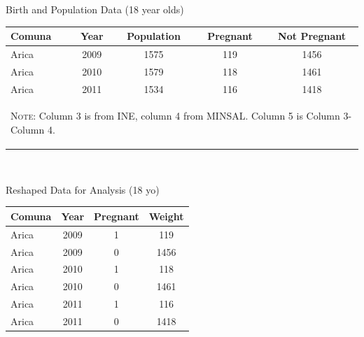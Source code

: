 \documentclass[10pt,letterpaper,subeqn]{beamer}
\begin{document}
\begin{frame}[label=sumR]

\hyperlink{sum}{}
\end{frame}

\begin{frame}[label=datV]

\begin{center}
Birth and Population Data (18 year olds)
\begin{tabular}{lcccc} \toprule
Comuna & Year & Population & Pregnant & Not Pregnant \\ \midrule
Arica & 2009 & 1575 & 119 & 1456 \\
Arica & 2010 & 1579 & 118 & 1461  \\ 
Arica & 2011 & 1534 & 116 & 1418 \\ \bottomrule
\multicolumn{5}{p{9cm}}{\begin{footnotesize}\textsc{Note:} Column 3 is from INE, column 4 from MINSAL. Column 5 is Column 3-Column 4.\end{footnotesize}}
\end{tabular} \\
\end{center}
\vspace{5mm}
\begin{center}
Reshaped Data for Analysis (18 yo)\\
\begin{tabular}{lccc} \toprule
Comuna & Year & Pregnant & Weight \\ \midrule
Arica & 2009 & 1 & 119 \\
Arica & 2009 & 0 & 1456 \\
Arica & 2010 & 1 & 118 \\
Arica & 2010 & 0 & 1461 \\
Arica & 2011 & 1 & 116 \\
Arica & 2011 & 0 & 1418 \\ \bottomrule
\end{tabular} \\
\end{center}
\hyperlink{sum}{}
\end{frame}

\begin{frame}[label=plausR]

\hyperlink{plaus}{}
\end{frame}
\end{document}
